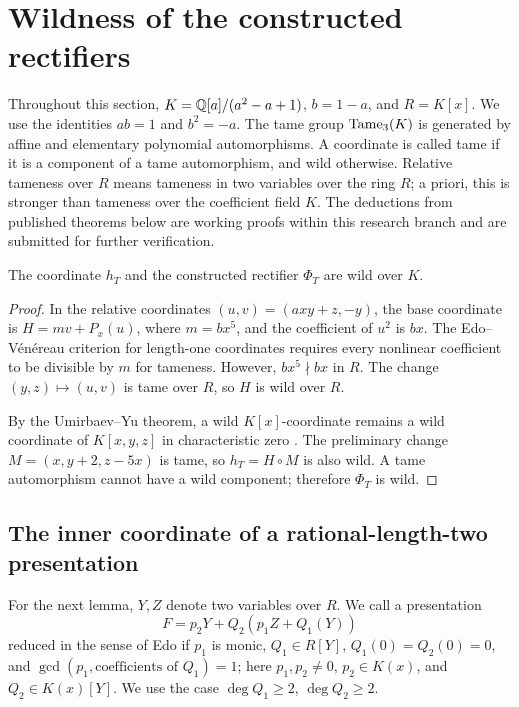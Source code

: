 \section{Wildness of the constructed rectifiers}\label{sec:group-results}

Throughout this section, $K={\mathbb Q}[a]/(a^2-a+1)$, $b=1-a$, and $R=K[x]$.
We use the identities $ab=1$ and $b^2=-a$.
The tame group $\operatorname{Tame}_3(K)$ is generated by affine and elementary
polynomial automorphisms. A coordinate is called tame if it is a component
of a tame automorphism, and wild otherwise.
Relative tameness over $R$ means tameness in two variables over the ring
$R$; a priori, this is stronger than tameness over the coefficient field
$K$. The deductions from published theorems below are working proofs
within this research branch and are submitted for further verification.

\begin{proposition}\label{prop:trefoil-wild}
The coordinate $h_T$ and the constructed rectifier $\Phi_T$ are wild
over $K$.
\end{proposition}
\begin{proof}
In the relative coordinates $(u,v)=(axy+z,-y)$, the base coordinate is
$H=mv+P_x(u)$, where $m=bx^5$, and the coefficient of $u^2$ is $bx$.
The Edo--V\'en\'ereau criterion for length-one coordinates
\cite[Proposition~2]{EV2001} requires every nonlinear coefficient to be
divisible by $m$ for tameness. However, $bx^5\nmid bx$ in $R$.
The change $(y,z)\mapsto(u,v)$ is tame over $R$, so $H$ is wild over $R$.

By the Umirbaev--Yu theorem, a wild $K[x]$-coordinate remains a wild
coordinate of $K[x,y,z]$ in characteristic zero
\cite[Main Theorem]{UY2004}.
The preliminary change $M=(x,y+2,z-5x)$ is tame, so $h_T=H\circ M$
is also wild. A tame automorphism cannot have a wild component;
therefore $\Phi_T$ is wild.
\end{proof}

\subsection{The inner coordinate of a rational-length-two presentation}

For the next lemma, $Y,Z$ denote two variables over $R$.
We call a presentation
\[
 F=p_2Y+Q_2(p_1Z+Q_1(Y))
\]
reduced in the sense of Edo if $p_1$ is monic,
$Q_1\in R[Y]$, $Q_1(0)=Q_2(0)=0$, and
$\gcd(p_1,\text{coefficients of }Q_1)=1$;
here $p_1,p_2\ne0$, $p_2\in K(x)$, and $Q_2\in K(x)[Y]$.
We use the case $\deg Q_1\ge2$, $\deg Q_2\ge2$.

